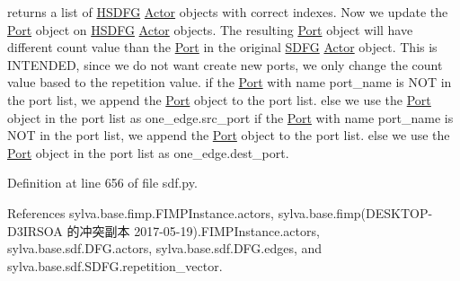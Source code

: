 returns a list of \hyperlink{classsylva_1_1base_1_1sdf_1_1_h_s_d_f_g}{H\+S\+D\+FG} \hyperlink{classsylva_1_1base_1_1sdf_1_1_actor}{Actor} objects with correct indexes. Now we update the \hyperlink{classsylva_1_1base_1_1sdf_1_1_port}{Port} object on \hyperlink{classsylva_1_1base_1_1sdf_1_1_h_s_d_f_g}{H\+S\+D\+FG} \hyperlink{classsylva_1_1base_1_1sdf_1_1_actor}{Actor} objects. The resulting \hyperlink{classsylva_1_1base_1_1sdf_1_1_port}{Port} object will have different {\ttfamily count} value than the \hyperlink{classsylva_1_1base_1_1sdf_1_1_port}{Port} in the original \hyperlink{classsylva_1_1base_1_1sdf_1_1_s_d_f_g}{S\+D\+FG} \hyperlink{classsylva_1_1base_1_1sdf_1_1_actor}{Actor} object. This is I\+N\+T\+E\+N\+D\+ED, since we do not want create new ports, we only change the {\ttfamily count} value based to the repetition value. if the \hyperlink{classsylva_1_1base_1_1sdf_1_1_port}{Port} with name {\ttfamily port\+\_\+name} is N\+OT in the port list, we append the \hyperlink{classsylva_1_1base_1_1sdf_1_1_port}{Port} object to the port list. else we use the \hyperlink{classsylva_1_1base_1_1sdf_1_1_port}{Port} object in the port list as {\ttfamily one\+\_\+edge.\+src\+\_\+port} if the \hyperlink{classsylva_1_1base_1_1sdf_1_1_port}{Port} with name {\ttfamily port\+\_\+name} is N\+OT in the port list, we append the \hyperlink{classsylva_1_1base_1_1sdf_1_1_port}{Port} object to the port list. else we use the \hyperlink{classsylva_1_1base_1_1sdf_1_1_port}{Port} object in the port list as {\ttfamily one\+\_\+edge.\+dest\+\_\+port}. 

Definition at line 656 of file sdf.\+py.



References sylva.\+base.\+fimp.\+F\+I\+M\+P\+Instance.\+actors, sylva.\+base.\+fimp(\+D\+E\+S\+K\+T\+O\+P-\/\+D3\+I\+R\+S\+O\+A 的冲突副本 2017-\/05-\/19).\+F\+I\+M\+P\+Instance.\+actors, sylva.\+base.\+sdf.\+D\+F\+G.\+actors, sylva.\+base.\+sdf.\+D\+F\+G.\+edges, and sylva.\+base.\+sdf.\+S\+D\+F\+G.\+repetition\+\_\+vector.


